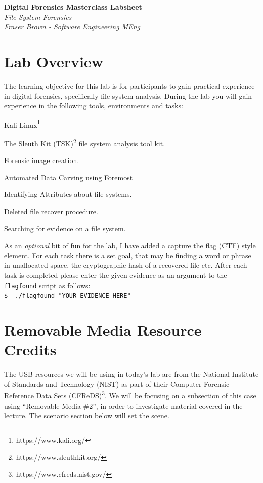 \documentclass[a4paper,11pt]{article}
\author{Fraser Brown}
\date{\today}
\begin{document}
\begin{titlepage}
   \begin{center}
      \Large\textbf{Digital Forensics Masterclass Labsheet}\\
      \large\textit{File System Forensics}\\
      \large\textit{Fraser Brown - Software Engineering MEng}
   \end{center}
\end{titlepage}

\tableofcontents
\newpage

\section{Lab Overview}
The learning objective for this lab is for participants to gain practical experience in digital forensics, specifically file system analysis. During the lab you will gain experience in the following tools, environments and tasks:
\begin{itemize*}
	\item Kali Linux\footnote{https://www.kali.org/}
	\item The Sleuth Kit (TSK)\footnote{https://www.sleuthkit.org/} file system analysis tool kit.
	\item Forensic image creation.
	\item Automated Data Carving using Foremost
	\item Identifying Attributes about file systems. %
	\item Deleted file recover procedure.
	\item Searching for evidence on a file system.
\end{itemize*}

As an \textit{optional} bit of fun for the lab, I have added a capture the flag (CTF) style element. For each task there is a set goal, that may be finding a word or phrase in unallocated space, the cryptographic hash of a recovered file etc. After each task is completed please enter the given evidence as an argument to the \texttt{flagfound} script as follows:\\
\verb|$  ./flagfound "YOUR EVIDENCE HERE"|


\section{Removable Media Resource Credits}
The USB resources we will be using in today's lab are from the National Institute of Standards and Technology (NIST) as part of their Computer Forensic Reference Data Sets (CFReDS)\footnote{https://www.cfreds.nist.gov/}.  We will be focusing on a subsection of this case using ``Removable Media {\#}2'', in order to investigate material covered in the lecture. The scenario section below will set the scene. \\
 
\end{document}
